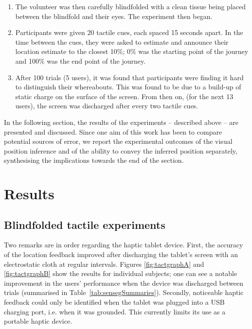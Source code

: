 \begin{enumerate}
\item The volunteer was then carefully blindfolded with a clean tissue being placed between the blindfold and their eyes. The experiment then began.

\item Participants were given 20 tactile cues, each spaced 15 seconds apart. In the time between the cues, they were asked to estimate and announce their location estimate to the closest 10\%; 0\% was the starting point of the journey and 100\% was the end point of the journey.

\item After 100 trials (5 users), it was found that participants were finding it hard to distinguish their whereabouts. This was found to be due to a build-up of static charge on the surface of the screen. From then on, (for the next 13 users), the screen was discharged after every two tactile cues.

\end{enumerate}
In the following section, the results of the experiments -- described above -- are presented and discussed. Since one aim of this work has been to compare potential sources of error, we report the experimental outcomes of the visual position inference and of the ability to convey the inferred position separately, synthesising the implications towards the end of the section.

\section{Results}
\label{sec:ch6results}

\subsection{Blindfolded tactile experiments}


Two remarks are in order regarding the haptic tablet device. First, the accuracy of the location feedback improved after discharging the tablet's screen with an electrostatic cloth at regular intervals. Figures \ref{fig:tactgraphA} and \ref{fig:tactgraphB} show the results for individual subjects; one can see a notable improvement in the users' performance when the device was discharged between trials (summarised in Table~\ref{tab:sensegSummaries}). Secondly, noticeable haptic feedback could only be identified when the tablet was plugged into a USB charging port, i.e. when it was grounded. This currently limits its use as a portable haptic device.
  
